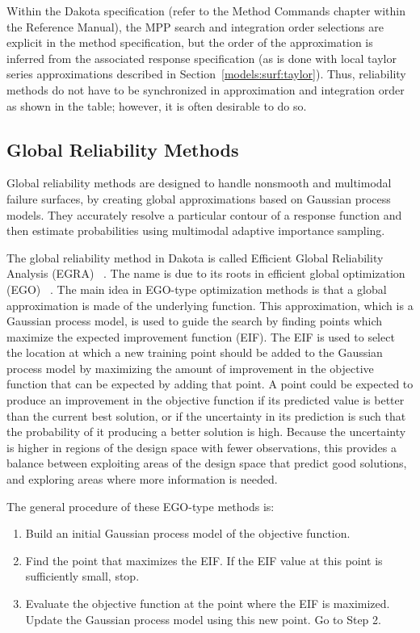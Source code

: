 Within the Dakota specification (refer to the Method Commands chapter
within the Reference Manual), the MPP search and integration order
selections are explicit in the method specification, but the order of
the approximation is inferred from the associated response
specification (as is done with local taylor series approximations
described in Section~\ref{models:surf:taylor}). Thus, reliability
methods do not have to be synchronized in approximation and
integration order as shown in the table; however, it is often
desirable to do so.


\subsection{Global Reliability Methods}\label{uq:reliability:global}

Global reliability methods are designed to handle nonsmooth and
multimodal failure surfaces, by creating global approximations based
on Gaussian process models. They accurately resolve a particular
contour of a response function and then estimate probabilities using
multimodal adaptive importance sampling.

The global reliability method in Dakota is called 
Efficient Global Reliability Analysis (EGRA) ~\cite{Bichon2008}. 
The name is due to its 
roots in efficient global optimization (EGO) ~\cite{Jon98,Hua06}.
The main idea in EGO-type optimization methods is that a global 
approximation is made of the underlying function. This approximation, 
which is a Gaussian process model, is used to guide the search by finding 
points which maximize the expected improvement function (EIF). 
The EIF is used to select the location at which a new training point should be
added to the Gaussian process model by maximizing the amount of improvement 
in the objective function that can be expected by adding that point.
A point could be expected to produce an improvement in the objective function 
if its predicted value is better than the current best solution, or if the 
uncertainty in its prediction is such that the probability of it producing
a better solution is high.
Because the uncertainty is higher in regions of the design space with fewer
observations, this provides a balance between exploiting areas of the
design space that predict good solutions, and exploring areas where more
information is needed.

The general procedure of these EGO-type methods is:
\begin{enumerate}
\item Build an initial Gaussian process model of the objective function.
\item Find the point that maximizes the EIF.
      If the EIF value at this point is sufficiently small, stop.
\item Evaluate the objective function at the point where the EIF is maximized.
      Update the Gaussian process model using this new point.
      Go to Step 2.
\end{enumerate}

